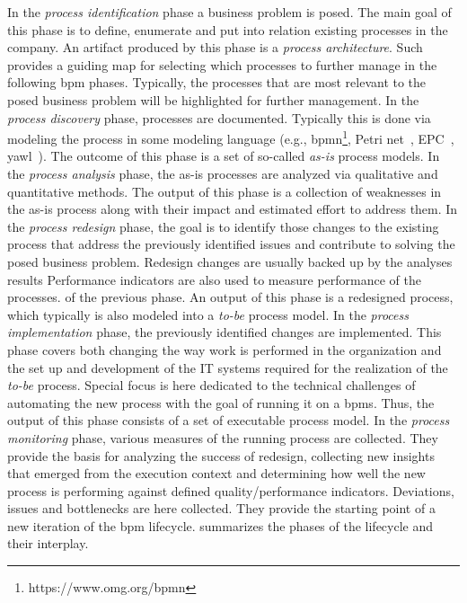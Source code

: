 In the \emph{process identification} phase a business problem is posed. The main goal of this phase is to define, enumerate and put into relation existing processes in the company. An artifact produced by this phase is a \emph{process architecture}. Such provides a guiding map for selecting which processes to further manage in the following \gls{bpm} phases. Typically, the processes that are most relevant to the posed business problem will be highlighted for further management.
In the \emph{process discovery} phase, processes are documented. Typically this is done via modeling the process in some modeling language (e.g., \gls{bpmn}\footnote{https://www.omg.org/bpmn}, Petri net~\citep{DBLP:journals/topnoc/LohmannVD09}, EPC~\citep{DBLP:books/wi/Dumas05/ScheerTA05}, \gls{yawl}~\citep{DBLP:journals/is/AalstH05}). The outcome of this phase is a set of so-called \emph{as-is} process models. 
In the \emph{process analysis} phase, the as-is processes are analyzed via qualitative and quantitative methods. The output of this phase is a collection of weaknesses in the as-is process along with their impact and estimated effort to address them.
In the \emph{process redesign} phase, the goal is to identify those changes to the existing process that address the previously identified issues and contribute to solving the posed business problem. Redesign changes are usually backed up by the analyses results Performance indicators are also used to measure performance of the processes. of the previous phase. An output of this phase is a redesigned process, which typically is also modeled into a \emph{to-be} process model.
In the \emph{process implementation} phase, the previously identified changes are implemented. This phase covers both changing the way work is performed in the organization and the set up and development of the IT systems required for the realization of the \emph{to-be} process. Special focus is here dedicated to the technical challenges of automating the new process with the goal of running it on a \gls{bpms}. Thus, the output of this phase consists of a set of executable process model. 
In the \emph{process monitoring} phase, various measures of the running process are collected. They provide the basis for analyzing the success of redesign, collecting new insights that emerged from the execution context and determining how well the new process is performing against defined quality/performance indicators. Deviations, issues and bottlenecks are here collected. They provide the starting point of a new iteration of the \gls{bpm} lifecycle.
 summarizes the phases of the lifecycle and their interplay.

